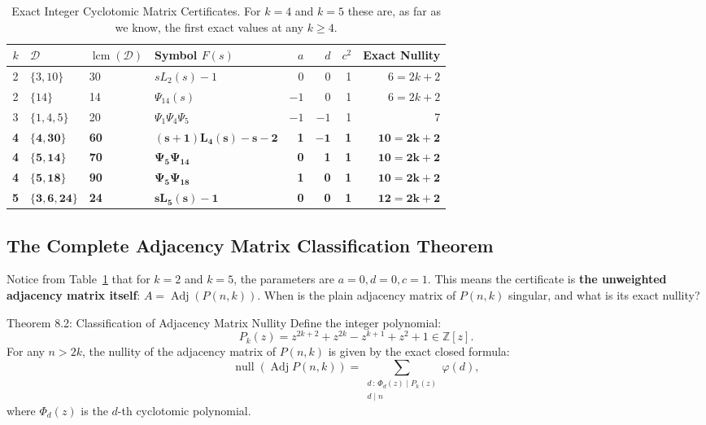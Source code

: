 \documentclass[11pt]{article}
\begin{document}
\begin{table}[htbp]
\centering
\begin{tabular}{clllrrrr}
\toprule
$k$ & $\mathcal D$ & $\operatorname{lcm}(\mathcal D)$ & Symbol $F(s)$ & $a$ & $d$ & $c^2$ & Exact Nullity \\
\midrule
2 & $\{3, 10\}$ & 30 & $s L_2(s) - 1$ & 0 & 0 & 1 & $6 = 2k+2$ \\
2 & $\{14\}$ & 14 & $\Psi_{14}(s)$ & $-1$ & 0 & 1 & $6 = 2k+2$ \\
3 & $\{1, 4, 5\}$ & 20 & $\Psi_1 \Psi_4 \Psi_5$ & $-1$ & $-1$ & 1 & 7 \\
\textbf{4} & $\mathbf{\{4, 30\}}$ & \textbf{60} & $\mathbf{(s+1)L_4(s) - s - 2}$ & \textbf{1} & $\mathbf{-1}$ & \textbf{1} & $\mathbf{10 = 2k+2}$ \\
\textbf{4} & $\mathbf{\{5, 14\}}$ & \textbf{70} & $\mathbf{\Psi_5 \Psi_{14}}$ & \textbf{0} & \textbf{1} & \textbf{1} & $\mathbf{10 = 2k+2}$ \\
\textbf{4} & $\mathbf{\{5, 18\}}$ & \textbf{90} & $\mathbf{\Psi_5 \Psi_{18}}$ & \textbf{1} & \textbf{0} & \textbf{1} & $\mathbf{10 = 2k+2}$ \\
\textbf{5} & $\mathbf{\{3, 6, 24\}}$ & \textbf{24} & $\mathbf{s L_5(s) - 1}$ & \textbf{0} & \textbf{0} & \textbf{1} & $\mathbf{12 = 2k+2}$ \\
\bottomrule
\end{tabular}
\caption{Exact Integer Cyclotomic Matrix Certificates. For $k=4$ and $k=5$ these are, as far as we know, the first exact values at any $k \ge 4$.}
\label{tab:cyclotomic}
\end{table}

\subsection{The Complete Adjacency Matrix Classification Theorem}

Notice from Table~\ref{tab:cyclotomic} that for $k=2$ and $k=5$, the parameters are $a=0, d=0, c=1$.
This means the certificate is \textbf{the unweighted adjacency matrix itself}: $A = \operatorname{Adj}(P(n,k))$.
When is the plain adjacency matrix of $P(n,k)$ singular, and what is its exact nullity?

\begin{thmbox}{Theorem 8.2: Classification of Adjacency Matrix Nullity}
Define the integer polynomial:
\begin{equation}
  P_k(z) = z^{2k+2} + z^{2k} - z^{k+1} + z^2 + 1 \in \mathbb{Z}[z].
\end{equation}
For any $n > 2k$, the nullity of the adjacency matrix of $P(n,k)$ is given by the exact closed formula:
\begin{equation}
  \operatorname{null}(\operatorname{Adj} P(n,k)) = \sum_{\substack{d \,:\, \Phi_d(z) \mid P_k(z) \\ d \mid n}} \varphi(d),
\end{equation}
where $\Phi_d(z)$ is the $d$-th cyclotomic polynomial.
\end{thmbox}
\end{document}
